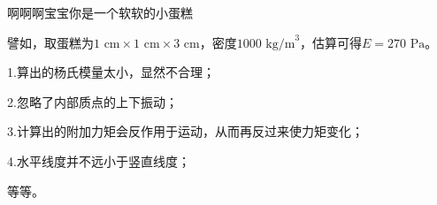 \documentclass[answer]{cphos}
\begin{document}
\begin{problem}[40]{啊啊啊宝宝你是一个软软的小蛋糕}
\begin{solution}
譬如，取蛋糕为$1 \text{~cm}\times1 \text{~cm}\times3 \text{~cm}$，密度$1000 \text{~kg/m}^3$，估算可得$E=270 \text{~Pa}$。


1.算出的杨氏模量太小，显然不合理；

2.忽略了内部质点的上下振动；

3.计算出的附加力矩会反作用于运动，从而再反过来使力矩变化；

4.水平线度并不远小于竖直线度；

等等。

\scoring
\end{solution}

\end{problem}
\end{document}
